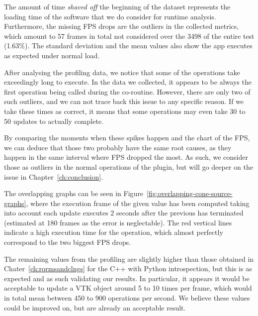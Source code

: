 The amount of time \textit{shaved off} the beginning of the dataset represents the loading time of the software that we do consider for runtime analysis. Furthermore, the missing FPS drops are the outliers in the collected metrics, which amount to 57 frames in total not considered over the 3498 of the entire test (1.63\%). The standard deviation and the mean values also show the app executes as expected under normal load.

After analysing the profiling data, we notice that some of the operations take exceedingly long to execute. In the data we collected, it appears to be always the first operation being called during the co-routine. However, there are only two of such outliers, and we can not trace back this issue to any specific reason. If we take these times as correct, it means that some operations may even take 30 to 50 updates to actually complete.

By comparing the moments when these spikes happen and the chart of the FPS, we can deduce that those two probably have the same root causes, as they happen in the same interval where FPS dropped the most. As such, we consider those as outliers in the normal operations of the plugin, but will go deeper on the issue in Chapter~\ref{ch:conclusion}.

The overlapping graphs can be seen in Figure~\ref{fig:overlapping-cone-source-graphs}, where the execution frame of the given value has been computed taking into account each update executes 2 seconds after the previous has terminated (estimated at 180 frames as the error is neglectable). The red vertical lines indicate a high execution time for the operation, which almost perfectly correspond to the two biggest FPS drops.

The remaining values from the profiling are slightly higher than those obtained in Chater~\ref{ch:rqrmsandclngs} for the C++ with Python introspection, but this is as expected and as such validating our results. In particular, it appears it would be acceptable to update a VTK object around 5 to 10 times per frame, which would in total mean between 450 to 900 operations per second. We believe these values could be improved on, but are already an acceptable result.

